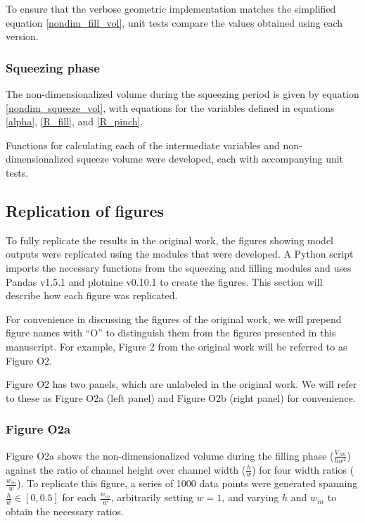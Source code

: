 To ensure that the verbose geometric implementation matches the simplified equation \eqref{nondim_fill_vol}, 
unit tests compare the values obtained using each version.

\subsubsection{Squeezing phase}
The non-dimensionalized volume during the squeezing period is given by equation \eqref{nondim_squeeze_vol}, with
equations for the variables defined in equations \eqref{alpha}, \eqref{R_fill}, and \eqref{R_pinch}.

Functions for calculating each of the intermediate variables and non-dimensionalized squeeze volume
were developed, each with accompanying unit tests.

\subsection{Replication of figures}

To fully replicate the results in the original work, the figures showing model outputs were
replicated using the modules that were developed. A Python script imports the necessary
functions from the squeezing and filling modules and uses Pandas\supercite{team_pandas_2020} v1.5.1
and plotnine\supercite{kibirige_plotnine_2022} v0.10.1 to create the figures.
This section will describe how each figure was replicated.

For convenience in discussing the figures of the original work, we will prepend figure names
with “O” to distinguish them from the figures presented in this manuscript. For example, Figure 2 from
the original work will be referred to as Figure O2.

Figure O2 has two panels, which are unlabeled in the original work. We will refer to these as Figure O2a
(left panel) and Figure O2b (right panel) for convenience.

\subsubsection{Figure O2a}

Figure O2a shows the non-dimensionalized volume during the filling phase ($\frac{V_{fill}}{hw^2}$)
against the ratio of channel height over channel width ($\frac{h}{w}$) for four width ratios 
($\frac{w_{in}}{w}$).
To replicate this figure, a series of 1000 data points were generated spanning $\frac{h}{w} \in [0,0.5]$
for each $\frac{w_{in}}{w}$, arbitrarily setting $w=1$, and varying $h$ and
$w_{in}$ to obtain the necessary ratios.

